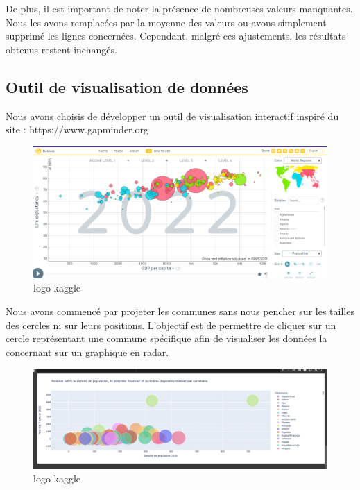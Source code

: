 \documentclass{article}
\begin{document}
De plus, il est important de noter la présence de nombreuses valeurs manquantes. Nous les avons remplacées par la moyenne des valeurs ou avons simplement supprimé les lignes concernées. Cependant, malgré ces ajustements, les résultats obtenus restent inchangés.

\subsection{Outil de visualisation de données}
Nous avons choisis de développer un outil de visualisation interactif inspiré du site : https://www.gapminder.org

\begin{figure}[h]
    \centering
    \includegraphics[width=1\textwidth]{gapminder_inspiration.png}
    \caption{logo kaggle}
    \label{fig:kaggle}
\end{figure}
\vspace{4cm}
Nous avons commencé par projeter les communes sans nous pencher sur les tailles des cercles ni sur leurs positions. L'objectif est de permettre de cliquer sur un cercle représentant une commune spécifique afin de visualiser les données la concernant sur un graphique en radar.

\begin{figure}[h]
    \centering
    \includegraphics[width=1\textwidth]{Capture_decran_2024-03-04_a_18.02.42.png}
    \caption{logo kaggle}
    \label{fig:kaggle}
\end{figure}
\end{document}
